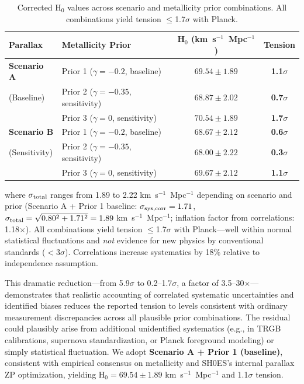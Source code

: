 \documentclass[preprint, linenumbers]{aastex701}
\begin{document}
\begin{table}[h]
\centering
\small
\caption{Corrected H$_0$ values across scenario and metallicity prior combinations. All combinations yield tension $\leq$1.7$\sigma$ with Planck.}
\label{tab:scenario_matrix}
\begin{tabular}{llcc}
\hline
Parallax & Metallicity Prior & H$_0$ (km~s$^{-1}$~Mpc$^{-1}$) & Tension \\
\hline
\textbf{Scenario A} & Prior 1 ($\gamma=-0.2$, baseline) & $69.54 \pm 1.89$ & \textbf{1.1$\sigma$} \\
(Baseline) & Prior 2 ($\gamma=-0.35$, sensitivity) & $68.87 \pm 2.02$ & \textbf{0.7$\sigma$} \\
 & Prior 3 ($\gamma=0$, sensitivity) & $70.54 \pm 1.89$ & \textbf{1.7$\sigma$} \\
\hline
\textbf{Scenario B} & Prior 1 ($\gamma=-0.2$, baseline) & $68.67 \pm 2.12$ & \textbf{0.6$\sigma$} \\
(Sensitivity) & Prior 2 ($\gamma=-0.35$, sensitivity) & $68.00 \pm 2.22$ & \textbf{0.3$\sigma$} \\
 & Prior 3 ($\gamma=0$, sensitivity) & $69.67 \pm 2.12$ & \textbf{1.1$\sigma$} \\
\hline
\end{tabular}
\end{table}

where $\sigma_{\rm total}$ ranges from 1.89 to 2.22 km~s$^{-1}$~Mpc$^{-1}$ depending on scenario and prior (Scenario A + Prior 1 baseline: $\sigma_{\rm sys,corr} = 1.71$, $\sigma_{\rm total} = \sqrt{0.80^2 + 1.71^2} = 1.89$ km~s$^{-1}$~Mpc$^{-1}$; inflation factor from correlations: 1.18$\times$). All combinations yield tension $\leq$1.7$\sigma$ with Planck---well within normal statistical fluctuations and \textit{not} evidence for new physics by conventional standards ($<$3$\sigma$). Correlations increase systematics by 18\% relative to independence assumption.

This dramatic reduction---from 5.9$\sigma$ to 0.2--1.7$\sigma$, a factor of 3.5--30$\times$---demonstrates that realistic accounting of correlated systematic uncertainties and identified biases reduces the reported tension to levels consistent with ordinary measurement discrepancies across all plausible prior combinations. The residual could plausibly arise from additional unidentified systematics (e.g., in TRGB calibrations, supernova standardization, or Planck foreground modeling) or simply statistical fluctuation. We adopt \textbf{Scenario A + Prior 1 (baseline)}, consistent with empirical consensus on metallicity and SH0ES's internal parallax ZP optimization, yielding H$_0 = 69.54 \pm 1.89$ km~s$^{-1}$~Mpc$^{-1}$ and 1.1$\sigma$ tension.
\end{document}
